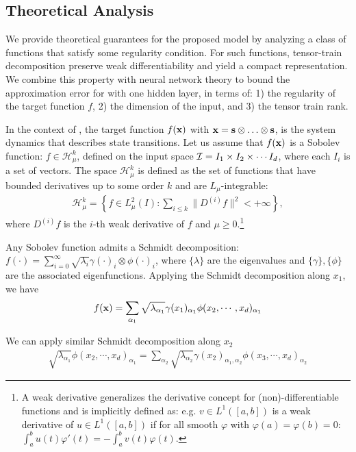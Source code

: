 \subsection{Theoretical Analysis}
We provide theoretical guarantees for the proposed \trnn{} model by analyzing a class of functions that satisfy some regularity condition. For such functions, tensor-train decomposition preserve weak differentiability and yield a compact representation.
%
We combine this property with neural network theory to bound the approximation error for \trnn{} with one hidden layer, in terms of:
%
1) the regularity of the target function $f$, 2) the dimension of the input, and 3) the tensor train rank.

In the context of \trnn{}, the target function $f({\mathbf{x}})$ with ${\mathbf{x}} = {\mathbf{s}} \otimes \ldots \otimes {\mathbf{s}}$, is the system dynamics that describes state transitions.
%
Let us assume that $f({\mathbf{x}})$ is a Sobolev function: $f\in\mathcal{H}^k_\mu$, defined on the input space ${\mathcal{I}}= I_1 \times I_2\times \cdots I_d $, where each $I_i$ is a set of vectors. The space $\mathcal{H}^k_\mu$ is defined as the set of  functions that have bounded derivatives up to some order $k$ and are $L_\mu$-integrable:
%
\begin{eqnarray}
\mathcal{H}^k_\mu =  \left\{  f  \in L^2_\mu(I):\sum_{i\leq k}\|D^{(i)}f\|^2   < +\infty \right\},
\end{eqnarray}
%
where $D^{(i)}f$ is the $i$-th weak derivative of $f$ and $\mu \geq 0$.\footnote{A weak derivative generalizes the derivative concept for (non)-differentiable functions and is implicitly defined as: e.g. $v\in L^1([a,b])$ is a weak derivative of $u\in L^1([a,b])$ if for all smooth $\varphi$ with $\varphi(a) = \varphi(b) = 0$: $\int_a^bu(t)\varphi'(t) = -\int_a^bv(t)\varphi(t)$.}

Any Sobolev function admits a Schmidt decomposition: $f(\cdot) = \sum_{i =0}^\infty \sqrt{\lambda_i} \gamma (\cdot)_i \otimes \phi (\cdot)_i $, where $\{\lambda \}$ are the eigenvalues and $\{\gamma\}, \{ \phi\}$ are the associated eigenfunctions.
%
Applying the Schmidt decomposition along $x_1$, we have 
\begin{eqnarray}
f({\mathbf{x}}) = \sum_{\alpha_1} \sqrt{\lambda_{\alpha_1}}\gamma (x_1)_{\alpha_1}\phi(x_2,\cdots, x_d)_{\alpha_1}
\end{eqnarray}

We  can apply similar Schmidt decomposition along $x_2$
\begin{eqnarray}
\sqrt{\lambda_{\alpha_1}}\phi(x_2,\cdots, x_d)_{\alpha_1} = \sum_{\alpha_2} \sqrt{\lambda_{\alpha_2}}\gamma (x_2)_{\alpha_1,\alpha_2}\phi(x_3,\cdots, x_d)_{\alpha_2}
\end{eqnarray}


